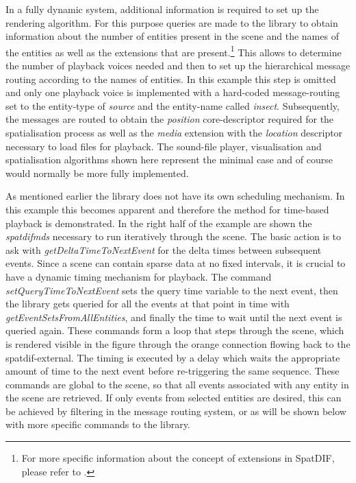 \documentclass{article}
\begin{document}
In a fully dynamic system, additional information is required to set up the rendering algorithm.
For this purpose queries are made to the library to obtain information about the number of entities present in the scene and the names of the entities as well as the extensions that are present.\footnote{For more specific information about the concept of extensions in SpatDIF, please refer to \cite{SpatDIF_SMC12, Peters:2013SpatDifCMJ, SpatDIF_03}. }
This allows to determine the number of playback voices needed and then to set up the hierarchical message routing according to the names of entities.
In this example this step is omitted and only one playback voice is implemented with a hard-coded message-routing set to the entity-type of \emph{source} and the entity-name called \emph{insect}.
Subsequently, the messages are routed to obtain the \emph{position} core-descriptor required for the spatialisation process as well as the \emph{media} extension with the \emph{location} descriptor necessary to load files for playback.
The sound-file player, visualisation and spatialisation algorithms \cite{schacher7Years} shown here represent the minimal case and of course would normally be more fully implemented.

As mentioned earlier the library does not have its own scheduling mechanism. 
In this example this becomes apparent and therefore the method for time-based playback is demonstrated.
In the right half of the example are shown the \emph{spatdifmds} necessary to run iteratively through the scene.
The basic action is to ask with \emph{getDeltaTimeToNextEvent} for the delta times between subsequent events.
Since a scene can contain sparse data at no fixed intervals, it is crucial to have a dynamic timing mechanism for playback.
The command \emph{setQueryTimeToNextEvent} sets the query time variable to the next event, then the library gets queried for all the events at that point in time with \emph{getEventSetsFromAllEntities}, and finally the time to wait until the next event is queried again.
These commands form a loop that steps through the scene, which is rendered visible in the figure through the orange connection flowing back to the spatdif-external.
The timing is executed by a delay which waits the appropriate amount of time to the next event before re-triggering the same sequence.
These commands are global to the scene, so that all events associated with any entity in the scene are retrieved.
If only events from selected entities are desired, this can be achieved by filtering in the message routing system, or as will be shown below with more specific commands to the library. %
\end{document}
